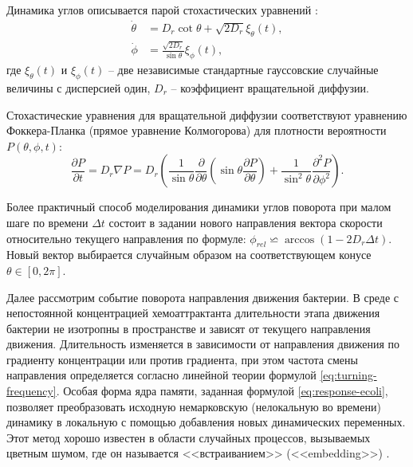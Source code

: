 Динамика углов описывается парой стохастических уравнений \cite{marino_dynamics_2019}:
\begin{equation}
    \begin{aligned}
	\dot{\theta} &= D_r\cot\theta +\sqrt{2D_r}\xi_{\theta}(t),\\
	\dot{\phi} &= \frac{\sqrt{2D_r}}{\sin\theta}\xi_{\phi}(t),
    \end{aligned}
    \label{eq:bacteria-angle-equations}
\end{equation}
где $\xi_{\theta}(t)$ и $\xi_{\phi}(t)$ -- две независимые стандартные гауссовские случайные величины с дисперсией один, $D_r$ -- коэффициент вращательной диффузии.

Стохастические уравнения для вращательной диффузии соответствуют уравнению Фоккера-Планка (прямое уравнение Колмогорова) для плотности вероятности $P(\theta,\phi,t)$:
\begin{equation}
	\frac{\partial P}{\partial t} = D_r \nabla P = 
	D_r \left ( \frac{1}{\sin \theta}\frac{\partial}{\partial \theta} \left (\sin\theta \frac{\partial P}{\partial \theta}\right ) + \frac{1}{\sin^2 \theta}\frac{\partial^2 P}{\partial \phi^2}\right ).
    \label{eq:foker-planck-angle-dynamics}
\end{equation}

Более практичный способ моделирования динамики углов поворота при малом шаге по времени $\Delta t$ состоит в задании нового направления вектора скорости относительно текущего направления по формуле: $\phi_{rel} \backsimeq \arccos{(1 - 2 D_r \Delta t)}$. Новый вектор выбирается случайным образом на соответствующем конусе $\theta \in [0, 2\pi]$.

Далее рассмотрим событие поворота направления движения бактерии. В среде с непостоянной концентрацией хемоаттрактанта длительности этапа движения бактерии не изотропны в пространстве и зависят от текущего направления движения. Длительность изменяется в зависимости от направления движения по градиенту концентрации или против градиента, при этом частота смены направления определяется согласно линейной теории формулой \cref{eq:turning-frequency}. Особая форма ядра памяти, заданная формулой \cref{eq:response-ecoli}, позволяет преобразовать исходную немарковскую (нелокальную во времени) динамику в локальную с помощью добавления новых динамических переменных. Этот метод хорошо известен в области случайных процессов, вызываемых цветным шумом, где он называется <<встраиванием>> (<<embedding>>) \cite{xie_marine_2015,grabert_microdynamics_1977}.

